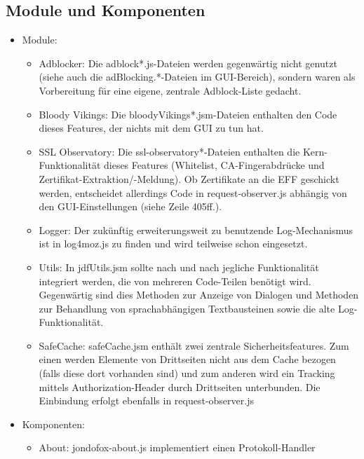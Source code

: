 \documentclass[a4paper,10pt]{scrartcl}
\begin{document}
    \subsection{Module und Komponenten}
      \begin{itemize}
        \item Module:
        \begin{itemize}
          \item Adblocker: Die adblock*.js-Dateien werden gegenwärtig nicht
            genutzt (siehe auch die adBlocking.*-Dateien im GUI-Bereich),
            sondern waren als Vorbereitung für eine eigene, zentrale
            Adblock-Liste gedacht.
          \item Bloody Vikings: Die bloodyVikings*.jsm-Dateien enthalten den
            Code dieses Features, der nichts mit dem GUI zu tun hat.
          \item SSL Observatory: Die ssl-observatory*-Dateien enthalten die
            Kern-Funk\-tio\-na\-li\-tät dieses Features (Whitelist,
            CA-Fingerabdrücke und Zertifikat-Extraktion/-Meldung). Ob
            Zertifikate an die EFF geschickt werden, entscheidet allerdings Code
            in request-observer.js abhängig von den GUI-Einstellungen (siehe
            Zeile 405ff.).
          \item Logger: Der zukünftig erweiterungsweit zu benutzende
            Log-Mechanismus ist in log4moz.js zu finden und wird teilweise schon
            eingesetzt.
          \item Utils: In jdfUtils.jsm sollte nach und nach jegliche
            Funktionalität integriert werden, die von mehreren Code-Teilen
            benötigt wird. Gegenwärtig sind dies Methoden zur Anzeige von
            Dialogen und Methoden zur Behandlung von sprachabhängigen
            Textbausteinen sowie die alte Log-Funktionalität.
          \item SafeCache: safeCache.jsm enthält zwei zentrale
            Sicherheitsfeatures. Zum einen werden Elemente von Drittseiten nicht
            aus dem Cache bezogen (falls diese dort vorhanden sind) und zum
            anderen wird ein Tracking mittels Authorization-Header durch
            Drittseiten unterbunden. Die Einbindung erfolgt ebenfalls in
            request-observer.js
        \end{itemize}
        \item Komponenten:
        \begin{itemize}
          \item About: jondofox-about.js implementiert einen Protokoll-Handler

\end{itemize}
\end{itemize}
\end{document}
